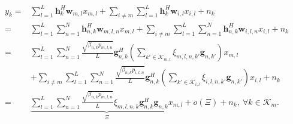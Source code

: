 \documentclass[12pt, draftclsnofoot, onecolumn]{IEEEtran}
\begin{document}
{\color{blue}

\begin{align}
y_{k} = &\sum_{l = 1}^L \mathbf{h}_k^H \mathbf{w}_{m,l} x_{m,l} + \sum_{i \neq m} \sum_{l = 1}^L \mathbf{h}_k^H \mathbf{w}_{i, l} x_{i,l} + n_k \\
= &\sum_{l = 1}^L \sum_{n = 1}^N \mathbf{h}_{n,k}^H \mathbf{w}_{m,l,n}  x_{m,l} + \sum_{i \neq m} \sum_{l = 1}^L \sum_{n = 1}^N \mathbf{h}_{n,k}^H \mathbf{w}_{i,l,n} x_{i,l} + n_k \\
= &\sum_{l = 1}^L \sum_{n = 1}^N \frac{\sqrt{\beta_{n,k} p_{m,l,n}}}{L} \mathbf{g}_{n,k}^H \left(\sum_{k' \in \mathcal{K}_{m,l}} \xi_{m,l,n,k'} \mathbf{g}_{n,k'} \right) x_{m,l} \\ &+ \sum_{i \neq m} \sum_{l = 1}^L \sum_{n = 1}^N \frac{\sqrt{\beta_{n,k} p_{i,l,n}}}{L} \mathbf{g}_{n,k}^H \left(\sum_{k' \in \mathcal{K}_{i,l}} \xi_{i,l,n,k'} \mathbf{g}_{n,k'} \right) x_{i,l} + n_k \\
= &\underbrace{\sum_{l=1}^L \sum_{n = 1}^N \frac{\sqrt{\beta_{n,k} p_{m,l,n}}} {L} \xi_{m,l,n,k} \mathbf{g}_{n,k}^H \mathbf{g}_{n,k} x_{m,l}}_{\Xi} + o(\Xi) + n_k,~\forall k \in \mathcal{K}_{m}.
\end{align}
}


% 
% 
\end{document}
